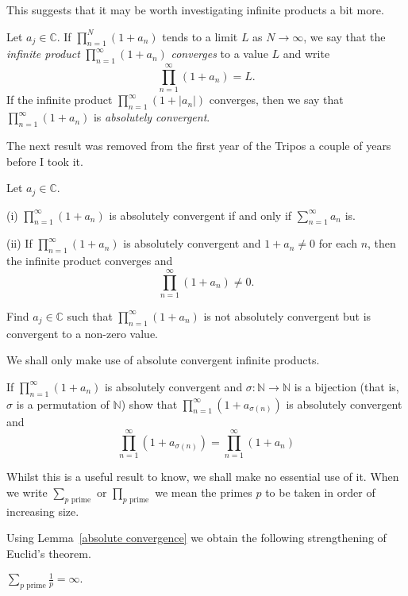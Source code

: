 This suggests that it may be worth investigating
infinite products a bit more.
\begin{definition} Let $a_{j}\in{\mathbb C}$. If
$\prod_{n=1}^{N}(1+a_{n})$ tends to a limit $L$
as $N\rightarrow\infty$, we say that the
\emph{infinite product} $\prod_{n=1}^{\infty}(1+a_{n})$
\emph{converges} to a value $L$ and write
\[\prod_{n=1}^{\infty}(1+a_{n})=L.\]
If the infinite product $\prod_{n=1}^{\infty}(1+|a_{n}|)$
converges, then we say that $\prod_{n=1}^{\infty}(1+a_{n})$
is \emph{absolutely convergent}.
\end{definition}
The next result was removed from the first year of
the Tripos a couple of years before I took it.
\begin{lemma}\label{absolute convergence}
Let $a_{j}\in{\mathbb C}$.

(i) $\prod_{n=1}^{\infty}(1+a_{n})$ is absolutely
convergent if and only if $\sum_{n=1}^{\infty}a_{n}$
is.

(ii) If $\prod_{n=1}^{\infty}(1+a_{n})$ is absolutely
convergent and $1+a_{n}\neq 0$ for each $n$, then
the infinite product converges and
\[\prod_{n=1}^{\infty}(1+a_{n})\neq 0.\]
\end{lemma}
\begin{exercise} Find $a_{j}\in{\mathbb C}$ such that
$\prod_{n=1}^{\infty}(1+a_{n})$ is not absolutely
convergent but is convergent to a non-zero value.
\end{exercise}
We shall only make use of absolute convergent infinite
products.
\begin{exercise} If $\prod_{n=1}^{\infty}(1+a_{n})$ is
absolutely convergent and
$\sigma:{\mathbb N}\rightarrow{\mathbb N}$
is a bijection
(that is, $\sigma$ is a permutation of ${\mathbb N}$)
show that $\prod_{n=1}^{\infty}(1+a_{\sigma(n)})$ is
absolutely convergent and
\[\prod_{n=1}^{\infty}(1+a_{\sigma(n)})
=\prod_{n=1}^{\infty}(1+a_{n})\]
\end{exercise}
Whilst this is a useful result to know, we shall make no essential
use of it. When we write
$\sum_{\text{$p$ prime}}$ or $\prod_{\text{$p$ prime}}$
we mean the primes $p$ to be taken in order of increasing
size.

Using Lemma~\ref{absolute convergence} we obtain
the following strengthening of Euclid's theorem.
\begin{theorem}[Euler]
${\displaystyle \sum_{\text{$p$ prime}}\frac{1}{p}=\infty.}$
\end{theorem}

